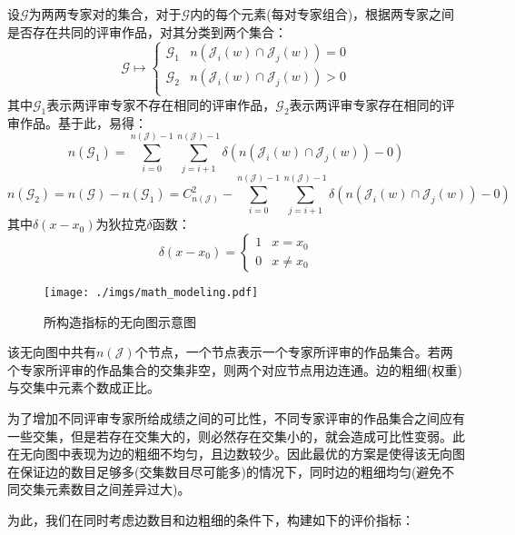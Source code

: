 \documentclass[12pt, onecolumn]{article}
\newcommand\normf{\fangsong}
\begin{document}
	设$\mathcal{G}$为两两专家对的集合，对于$\mathcal{G}$内的每个元素(每对专家组合)，根据两专家之间是否存在共同的评审作品，对其分类到两个集合：
	\begin{equation*}
	\mathcal{G}\mapsto\begin{cases}
	\mathcal{G}_1&n\left(\mathcal{J}_i(w)\cap\mathcal{J}_j(w) \right)=0\\
	\mathcal{G}_2&n\left(\mathcal{J}_i(w)\cap\mathcal{J}_j(w) \right)> 0\\
	\end{cases}
	\end{equation*}
	其中$\mathcal{G}_1$表示两评审专家不存在相同的评审作品，$\mathcal{G}_2$表示两评审专家存在相同的评审作品。基于此，易得：
	\begin{equation*}
	n(\mathcal{G}_1)=\sum_{i=0}^{n(\mathcal{J})-1}\sum_{j=i+1}^{n(\mathcal{J})-1}
	\delta(n\left(\mathcal{J}_i(w)\cap\mathcal{J}_j(w) \right)-0)
	\end{equation*}
	\begin{equation*}
	n(\mathcal{G}_2)=
	n(\mathcal{G})-n(\mathcal{G}_1)=
	C_{n(\mathcal{J})}^{2}-\sum_{i=0}^{n(\mathcal{J})-1}\sum_{j=i+1}^{n(\mathcal{J})-1}
	\delta(n\left(\mathcal{J}_i(w)\cap\mathcal{J}_j(w) \right)-0)
	\end{equation*}
	其中$\delta(x-x_0)$为狄拉克$\delta$函数：
	\begin{equation*}
	\delta(x-x_0)=\begin{cases}
	1&x=x_0\\0&x\ne x_0
	\end{cases}
	\end{equation*}
	
	
	\begin{figure}[t]
		\centering
		\texttt{[image: ./imgs/math\_modeling.pdf]}
		\caption{\normf 所构造指标的无向图示意图}
	\end{figure}
	该无向图中共有$n(\mathcal{J})$个节点，一个节点表示一个专家所评审的作品集合。若两个专家所评审的作品集合的交集非空，则两个对应节点用边连通。边的粗细(权重)与交集中元素个数成正比。
	
	为了增加不同评审专家所给成绩之间的可比性，不同专家评审的作品集合之间应有一些交集，但是若存在交集大的，则必然存在交集小的，就会造成可比性变弱。此在无向图中表现为边的粗细不均匀，且边数较少。因此最优的方案是使得该无向图在保证边的数目足够多(交集数目尽可能多)的情况下，同时边的粗细均匀(避免不同交集元素数目之间差异过大)。
	
	为此，我们在同时考虑边数目和边粗细的条件下，构建如下的评价指标：
	
\end{document}
